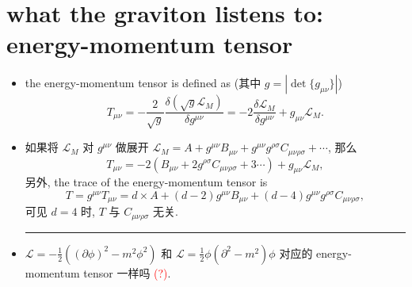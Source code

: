 \section{what the graviton listens to: energy-momentum tensor}
\begin{itemize}
	\item the energy-momentum tensor is defined as (其中 $g = |\det \{g_{\mu \nu}\}|$)
	\begin{equation}
		T_{\mu \nu} = - \frac{2}{\sqrt{g}} \frac{\delta (\sqrt{g} \mathcal{L}_M)}{\delta g^{\mu \nu}} = - 2 \frac{\delta \mathcal{L}_M}{\delta g^{\mu \nu}} + g_{\mu \nu} \mathcal{L}_M.
	\end{equation}
	
	\item 如果将 $\mathcal{L}_M$ 对 $g^{\mu \nu}$ 做展开 $\mathcal{L}_M = A + g^{\mu \nu} B_{\mu \nu} + g^{\mu \nu} g^{\rho \sigma} C_{\mu \nu \rho \sigma} + \cdots$, 那么
	\begin{equation}
		T_{\mu \nu} = - 2 (B_{\mu \nu} + 2 g^{\rho \sigma} C_{\mu \nu \rho \sigma} + 3 \cdots) + g_{\mu \nu} \mathcal{L}_M,
	\end{equation}
	另外, the trace of the energy-momentum tensor is
	\begin{equation}
		T = g^{\mu \nu} T_{\mu \nu} = d \times A + (d - 2) g^{\mu \nu} B_{\mu \nu} + (d - 4) g^{\mu \nu} g^{\rho \sigma} C_{\mu \nu \rho \sigma},
	\end{equation}
	可见 $d = 4$ 时, $T$ 与 $C_{\mu \nu \rho \sigma}$ 无关.
	
	\noindent\rule[0.5ex]{\linewidth}{0.5pt} %
	
	\item $\mathcal{L} = - \frac{1}{2} ((\partial \phi)^2 - m^2 \phi^2)$ 和 $\mathcal{L} = \frac{1}{2} \phi (\partial^2 - m^2) \phi$ 对应的 energy-momentum tensor 一样吗 \textcolor{red}{(?)}.
\end{itemize}

